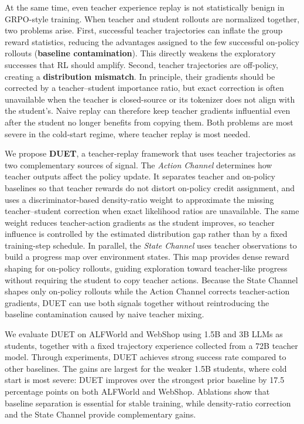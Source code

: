 \label{sec:biases}
 At the same time, even teacher experience replay is not statistically benign in GRPO-style training. When teacher and student rollouts are normalized together, two problems arise. First, successful teacher trajectories can inflate the group reward statistics, reducing the advantages assigned to the few successful on-policy rollouts (\textbf{baseline contamination}). This directly weakens the exploratory successes that RL should amplify. Second, teacher trajectories are off-policy, creating a \textbf{distribution mismatch}. In principle, their gradients should be corrected by a teacher--student importance ratio, but exact correction is often unavailable when the teacher is closed-source or its tokenizer does not align with the student's. Naive replay can therefore keep teacher gradients influential even after the student no longer benefits from copying them. Both problems are most severe in the cold-start regime, where teacher replay is most needed.

We propose \textbf{DUET}, a teacher-replay framework that uses teacher trajectories as two complementary sources of signal. The \emph{Action Channel} determines how teacher outputs affect the policy update. It separates teacher and on-policy baselines so that teacher rewards do not distort on-policy credit assignment, and uses a discriminator-based density-ratio weight to approximate the missing teacher--student correction when exact likelihood ratios are unavailable. The same weight reduces teacher-action gradients as the student improves, so teacher influence is controlled by the estimated distribution gap rather than by a fixed training-step schedule. In parallel, the \emph{State Channel} uses teacher observations to build a progress map over environment states. This map provides dense reward shaping for on-policy rollouts, guiding exploration toward teacher-like progress without requiring the student to copy teacher actions. Because the State Channel shapes only on-policy rollouts while the Action Channel corrects teacher-action gradients, DUET can use both signals together without reintroducing the baseline contamination caused by naive teacher mixing.

We evaluate DUET on ALFWorld and WebShop using 1.5B and 3B LLMs as students, together with a fixed trajectory experience collected from a 72B teacher model. Through experiments, DUET achieves strong success rate compared to other baselines. The gains are largest for the weaker 1.5B students, where cold start is most severe: DUET improves over the strongest prior baseline by 17.5 percentage points on both ALFWorld and WebShop. Ablations show that baseline separation is essential for stable training, while density-ratio correction and the State Channel provide complementary gains.

